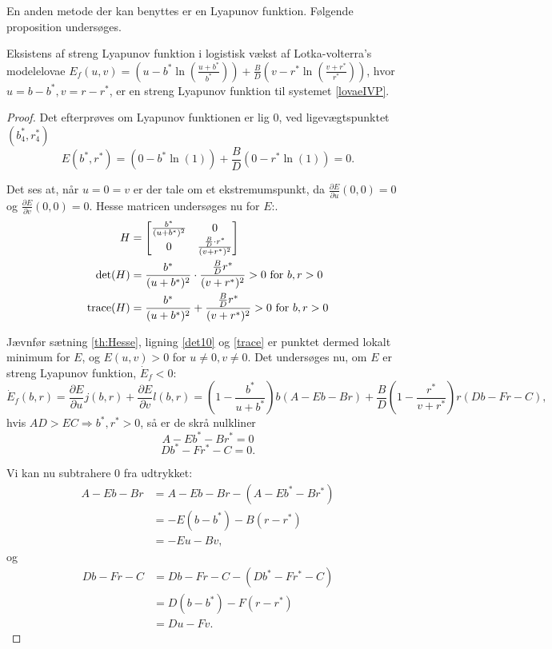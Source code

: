 En anden metode der kan benyttes er en Lyapunov funktion. Følgende proposition undersøges. 
\begin{prop}{Eksistens af streng Lyapunov funktion i logistisk vækst af Lotka-volterra's model}{elovae}
$E_f(u, v) = \left( u-b^* \ln{\left( \frac{u+b^*}{b^*} \right)} \right) + \frac{B}{D} \left( v-r^* \ln{\left( \frac{v+r^*}{r^*} \right)} \right)$, hvor $u=b-b^*, v=r-r^*$, er en streng Lyapunov funktion til systemet \eqref{lovaeIVP}.
\end{prop}

\begin{proof}
Det efterprøves om Lyapunov funktionen er lig 0, ved ligevægtspunktet $(b_4^*,r_4^*)$
$$E(b^*, r^*) =  \left( 0-b^* \ln{(1)} \right) + \frac{B}{D} \left( 0-r^* \ln{(1)} \right)=0.$$
 
Det ses at, når $u=0=v$ er der tale om et ekstremumspunkt, da $\frac{\partial E}{\partial u}(0,0)=0$ og $\frac{\partial E}{\partial v} (0,0)=0$. Hesse matricen undersøges nu for $E$:. 
 \begin{align*}
     H&=\begin{bmatrix}
     \frac{ b^*}{(u+b^*)^2} & 0 \\
     0 & \frac{\frac{B}{D}\cdot r^*}{(v+r^*)^2}
     \end{bmatrix}\\
     \det (H)&= \frac{ b^*}{(u+b^*)^2} \cdot \frac{\frac{B}{D} r^*}{(v+r^*)^2} > 0 \ \text{for} \ b,r>0\\
     \textnormal{trace}(H)&= \frac{ b^*}{(u+b^*)^2} + \frac{\frac{B}{D} r^*}{(v+r^*)^2} > 0 \ \text{for} \ b,r>0\\
 \end{align*}
 
 Jævnfør sætning \ref{th:Hesse}, ligning \eqref{det10} og \eqref{trace} er punktet dermed lokalt minimum for $E$, og $E(u,v) > 0$ for $u \neq 0, v \neq 0$.
 \hfill \break
Det undersøges nu, om $E$ er streng Lyapunov funktion, $\dot{E}_f < 0$:
$$\dot{E}_f (b, r)=\frac{\partial E}{\partial u}j(b,r) + \frac{\partial E}{\partial v}l(b,r) =  \left( 1 - \frac{b^*}{u+b^*}\right) b (A-Eb-Br) + \frac{B}{D} \left( 1 - \frac{r^*}{v+r^*}\right) r (Db-Fr-C),$$
hvis $AD > EC \Rightarrow b^*, r^* > 0$, så er de skrå nulkliner
$$A-Eb^*-Br^* = 0$$
$$Db^*-Fr^*-C = 0.$$

Vi kan nu subtrahere 0 fra udtrykket: 
\begin{align*}
    A-Eb-Br &= A-Eb-Br-(A-Eb^*-Br^*) \\
    &=-E(b-b^*)-B(r-r^*) \\
    &=-Eu-Bv,
\end{align*}
og
\begin{align*}
    Db-Fr-C &= Db-Fr-C-(Db^*-Fr^*-C) \\
    &=D(b-b^*)-F(r-r^*) \\
    &=Du-Fv.
\end{align*}


\end{proof}
